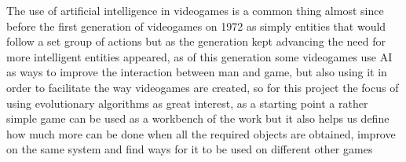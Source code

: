 \documentclass[conference]{IEEEtran}
\begin{document}
The use of artificial intelligence in videogames is a common thing almost since before the first generation of videogames on 1972 as simply entities that would follow a set group of actions but as the generation kept advancing the need for more intelligent entities appeared, as of this generation some videogames use AI as ways to improve the interaction between man and game, but also using it in order to facilitate the way videogames are created, so for this project the focus of using evolutionary algorithms as great interest, as a starting point a rather simple game can be used as a workbench of the work but it also helps us define how much more can be done when all the required objects are obtained, improve on the same system and find ways for it to be used on different other games

\printbibliography
\newrefcontext[sorting=ydnt]
\end{document}
